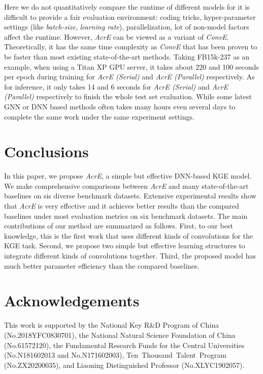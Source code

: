 \documentclass[11pt]{article}
\begin{document}
Here we do not quantitatively compare the runtime of different models for it is  difficult to provide a fair evaluation environment: coding tricks, hyper-parameter settings (like  \emph{batch-size}, \emph{learning rate}), parallelization, lot of non-model factors  affect the runtime. However, {\em AcrE} can be viewed as a variant of \emph{ConvE}. Theoretically, it has the same time complexity as \emph{ConvE} that has been proven to be faster than most existing state-of-the-art methods.  Taking FB15k-237 as an example, when using a Titan XP GPU server, it takes about 220 and 100 seconds per epoch during training for \emph{AcrE (Serial)} and \emph{AcrE ({Parallel})} respectively. As for inference, it only takes 14 and 6 seconds  for \emph{AcrE (Serial)} and \emph{AcrE ({Parallel})} respectively to finish the whole test set evaluation.  While some latest GNN or DNN based methods often takes many hours even several days to complete the same work under the same experiment settings. 

\section{Conclusions}
In this paper, we propose \emph{AcrE}, a simple but effective DNN-based KGE model. We make comprehensive comparisons between \emph{AcrE} and many state-of-the-art baselines on sis diverse benchmark datasets. Extensive experimental results show that \emph{AcrE} is very effective and it achieves better results than the compared baselines under most evaluation metrics on six benchmark datasets.  The main contributions of our method are summarized as follows. 
First, to our best knowledge, this is the first work that uses different kinds of convolutions for the KGE task. Second, we propose two simple but effective learning structures to integrate different kinds of convolutions together. Third, the proposed model  has much better parameter efficiency than the compared baselines.

\section*{Acknowledgements}
This work is supported by the National Key R\&D Program of China (No.2018YFC0830701), the National Natural Science Foundation of China (No.61572120), the Fundamental Research Funds for the Central Universities (No.N181602013 and No.N171602003), Ten Thousand Talent Program (No.ZX20200035), and Liaoning Distinguished Professor (No.XLYC1902057).



\end{document}
